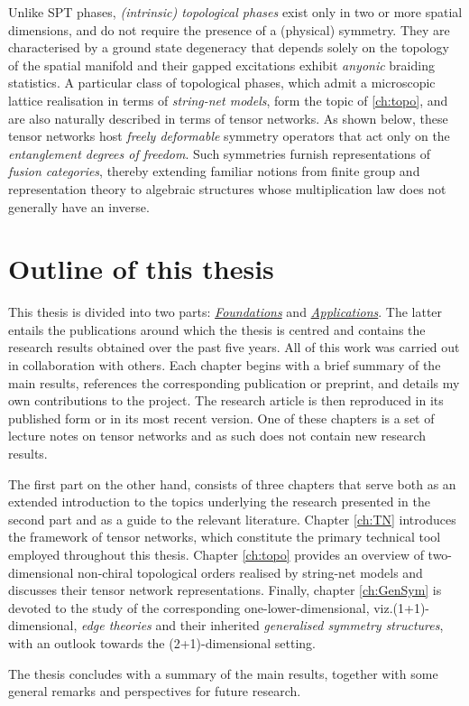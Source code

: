 Unlike SPT phases, \emph{(intrinsic) topological phases} exist only in two or more spatial dimensions, and do not require the presence of a (physical) symmetry. They are characterised by a ground state degeneracy that depends solely on the topology of the spatial manifold and their gapped excitations exhibit \emph{anyonic} braiding statistics. A particular class of topological phases, which admit a microscopic lattice realisation in terms of \emph{string-net models}, form the topic of \cref{ch:topo}, and are also naturally described in terms of tensor networks. As shown below, these tensor networks host \emph{freely deformable} symmetry operators that act only on the \emph{entanglement degrees of freedom}. Such symmetries furnish representations of \emph{fusion categories}, thereby extending familiar notions from finite group and representation theory to algebraic structures whose multiplication law does not generally have an inverse.
\section{Outline of this thesis}
This thesis is divided into two parts: \hyperref[part:Foundations]{\emph{Foundations}} and \hyperref[part:Applications]{\emph{Applications}}. The latter entails the publications around which the thesis is centred and contains the research results obtained over the past five years. All of this work was carried out in collaboration with others. Each chapter begins with a brief summary of the main results, references the corresponding publication or preprint, and details my own contributions to the project. The research article is then reproduced in its published form or in its most recent version. One of these chapters is a set of lecture notes on tensor networks and as such does not contain new research results.

The first part on the other hand, consists of three chapters that serve both as an extended introduction to the topics underlying the research presented in the second part and as a guide to the relevant literature. Chapter \ref{ch:TN} introduces the framework of tensor networks, which constitute the primary technical tool employed throughout this thesis. Chapter \ref{ch:topo} provides an overview of two-dimensional non-chiral topological orders realised by string-net models and discusses their tensor network representations. Finally, chapter \ref{ch:GenSym} is devoted to the study of the corresponding one-lower-dimensional, viz.(1+1)-dimensional, \emph{edge theories} and their inherited \emph{generalised symmetry structures}, with an outlook towards the (2+1)-dimensional setting.

The thesis concludes with a summary of the main results, together with some general remarks and perspectives for future research.